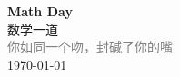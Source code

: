 \vspace*{\fill}
\begin{center}
    \textcolor{orange!50}{\Huge\textbf{Math Day}} \\[1em]
    \textcolor{orange!60!pink}{\Large 数学一道} \\[2em]
    \textcolor{gray}{\large 你如同一个吻，封碱了你的嘴} \\[1em]
    \today
\end{center}
\vspace*{\fill}
\clearpage


\clearpage

\clearpage
